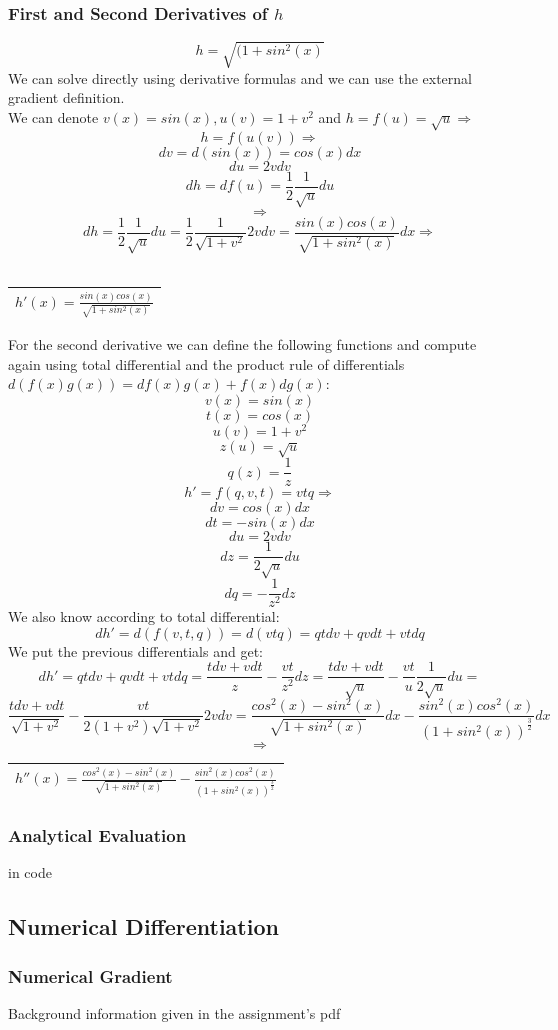 \documentclass[12pt]{article}
\newcommand{\rectres}[1]{
\begin{center}
\begin{tabular}{ |c| }
\hline
 #1\\
\hline
\end{tabular}
\end{center}
}
\begin{document}
\subsubsection{First and Second Derivatives of $h$}
$$h=\sqrt{(1+sin^2(x)}$$
We can solve directly using derivative formulas and we can use the external gradient definition.\\
We can denote $v(x)=sin(x),u(v)=1+v^2$ and $h = f(u)=\sqrt{u} \Rightarrow$ 
$$h=f(u(v)) \Rightarrow$$
$$dv=d(sin(x))=cos(x)dx$$
$$ du=2vdv$$
$$ dh=df(u)=\frac{1}{2}\frac{1}{\sqrt{u}}du$$
$$\Rightarrow$$
$$dh=\frac{1}{2}\frac{1}{\sqrt{u}}du=\frac{1}{2}\frac{1}{\sqrt{1+v^2}}2vdv=\frac{sin(x)cos(x)}{\sqrt{1+sin^2(x)}}dx \Rightarrow$$\\
\rectres{$h'(x)=\frac{sin(x)cos(x)}{\sqrt{1+sin^2(x)}}$}
For the second derivative we can define the following functions and compute again using total differential and the product rule of differentials $d(f(x)g(x))=df(x)g(x) + f(x)dg(x)$:\\
$$v(x)=sin(x)$$ 
$$t(x)=cos(x)$$
$$u(v)=1+v^2$$
$$z(u)=\sqrt{u}$$
$$q(z)=\frac{1}{z}$$
$$h' = f(q,v,t)=vtq\Rightarrow$$
$$dv=cos(x)dx$$
$$dt=-sin(x)dx$$
$$du=2vdv$$
$$dz=\frac{1}{2\sqrt{u}}du$$
$$dq=-\frac{1}{z^2}dz$$
We also know according to total differential:\\
$$dh'=d(f(v,t,q))=d(vtq)=qtdv+qvdt+vtdq$$
We put the previous differentials and get:\\
$$dh'=qtdv+qvdt+vtdq=\frac{tdv+vdt}{z}-\frac{vt}{z^2}dz=\frac{tdv+vdt}{\sqrt{u}}-\frac{vt}{u}\frac{1}{2\sqrt{u}}du=$$
$$\frac{tdv+vdt}{\sqrt{1+v^2}}-\frac{vt}{2(1+v^2)\sqrt{1+v^2}}2vdv=\frac{cos^2(x)-sin^2(x)}{\sqrt{1+sin^2(x)}}dx-\frac{sin^2(x)cos^2(x)}{(1+sin^2(x))^{\frac{3}{2}}}dx$$
$$\Rightarrow$$
\rectres{$h''(x)=\frac{cos^2(x)-sin^2(x)}{\sqrt{1+sin^2(x)}}-\frac{sin^2(x)cos^2(x)}{(1+sin^2(x))^{\frac{3}{2}}}$}

\subsubsection{Analytical Evaluation}
in code

\subsection{Numerical Differentiation}
\subsubsection{Numerical Gradient}
Background information given in the assignment's pdf
\end{document}
